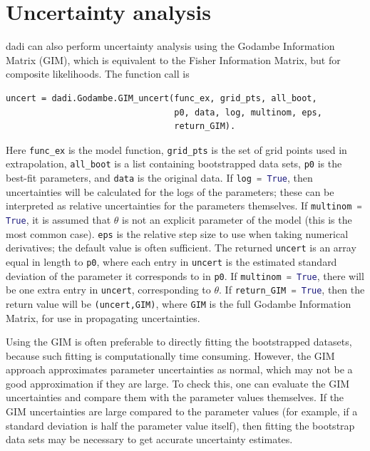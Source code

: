 \documentclass[12pt]{article}
\makeatletter
\newcommand{\dadi}{dadi\xspace}
\newcommand{\py}[1]{\lstinline[language=Python, showstringspaces=False]@#1@}
\makeatother
\begin{document}
\section{Uncertainty analysis}
\dadi can also perform uncertainty analysis using the Godambe Information Matrix (GIM), which is equivalent to the Fisher Information Matrix, but for composite likelihoods.
The function call is
\begin{lstlisting}
uncert = dadi.Godambe.GIM_uncert(func_ex, grid_pts, all_boot,
                                 p0, data, log, multinom, eps,
                                 return_GIM).
\end{lstlisting}
Here \py{func_ex} is the model function, \py{grid_pts} is the set of grid points used in extrapolation, \py{all_boot} is a list containing bootstrapped data sets, \py{p0} is the best-fit parameters, and \py{data} is the original data.
If \py{log = True}, then uncertainties will be calculated for the logs of the parameters; these can be interpreted as relative uncertainties for the parameters themselves.
If \py{multinom = True}, it is assumed that $\theta$ is not an explicit parameter of the model (this is the most common case).
\py{eps} is the relative step size to use when taking numerical derivatives; the default value is often sufficient.
The returned \py{uncert} is an array equal in length to \py{p0}, where each entry in \py{uncert} is the estimated standard deviation of the parameter it corresponds to in \py{p0}.
If \py{multinom = True}, there will be one extra entry in \py{uncert}, corresponding to $\theta$.
If \py{return_GIM = True}, then the return value will be \py{(uncert,GIM)}, where \py{GIM} is the full Godambe Information Matrix, for use in propagating uncertainties.

Using the GIM is often preferable to directly fitting the bootstrapped datasets, because such fitting is computationally time consuming.
However, the GIM approach approximates parameter uncertainties as normal, which may not be a good approximation if they are large.
To check this, one can evaluate the GIM uncertainties and compare them with the parameter values themselves.
If the GIM uncertainties are large compared to the parameter values (for example, if a standard deviation is half the parameter value itself), then fitting the bootstrap data sets may be necessary to get accurate uncertainty estimates.
\end{document}

